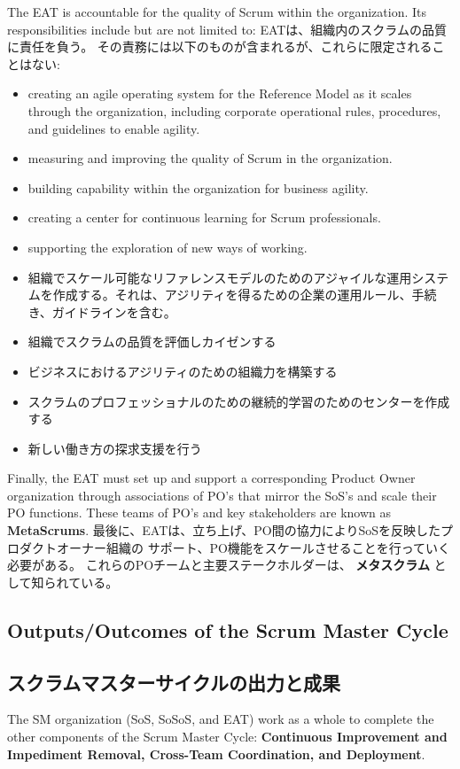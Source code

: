 \documentclass[12pt,a4paper,parskip=full]{scrartcl}
\begin{document}
The EAT is accountable for the quality of Scrum within the organization.
Its responsibilities include but are not limited to:
\fi
EATは、組織内のスクラムの品質に責任を負う。
その責務には以下のものが含まれるが、これらに限定されることはない:
\begin{itemize}
\item creating an agile operating system for the Reference Model as it
scales through the organization, including corporate operational rules,
procedures, and guidelines to enable agility.
\item measuring and improving the quality of Scrum in the organization.
\item building capability within the organization for business agility.
\item creating a center for continuous learning for Scrum professionals.
\item supporting the exploration of new ways of working.
\end{itemize}
\fi
\begin{itemize}
\item 組織でスケール可能なリファレンスモデルのためのアジャイルな運用システムを作成する。それは、アジリティを得るための企業の運用ルール、手続き、ガイドラインを含む。
\item 組織でスクラムの品質を評価しカイゼンする
\item ビジネスにおけるアジリティのための組織力を構築する
\item スクラムのプロフェッショナルのための継続的学習のためのセンターを作成する
\item 新しい働き方の探求支援を行う
\end{itemize}
Finally, the EAT must set up and support a corresponding Product Owner
organization through associations of PO's that mirror the SoS's and scale
their PO functions. These teams of PO's and key stakeholders are known as
\textbf{MetaScrums}.
\fi
最後に、EATは、立ち上げ、PO間の協力によりSoSを反映したプロダクトオーナー組織の
サポート、PO機能をスケールさせることを行っていく必要がある。
これらのPOチームと主要ステークホルダーは、 \textbf{メタスクラム} として知られている。

\subsection{Outputs/Outcomes of the Scrum Master Cycle}
\fi
\subsection{スクラムマスターサイクルの出力と成果}
The SM organization (SoS, SoSoS, and EAT) work as a whole to complete the
other components of the Scrum Master Cycle: \textbf{Continuous Improvement
and Impediment Removal, Cross-Team Coordination, and Deployment}.
\end{document}
